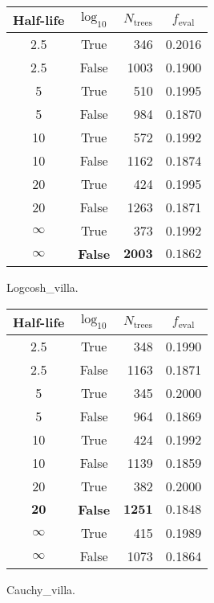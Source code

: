 \begin{margintable}
  \begin{tabular}{@{}ccrc@{}}
    Half-life & $\log_{10}$ & $N_\mathrm{trees}$ & $f_\mathrm{eval}$ \\
    \midrule
    \num{2.5} & True & \num{346} & \num{0.2016} \\
    \num{2.5} & False & \num{1003} & \num{0.1900} \\
    \num{5} & True & \num{510} & \num{0.1995} \\
    \num{5} & False & \num{984} & \num{0.1870} \\
    \num{10} & True & \num{572} & \num{0.1992} \\
    \num{10} & False & \num{1162} & \num{0.1874} \\
    \num{20} & True & \num{424} & \num{0.1995} \\
    \num{20} & False & \num{1263} & \num{0.1871} \\
    $\infty$ & True & \num{373} & \num{0.1992} \\
    $\bm{\infty}$ & \textbf{False} & $\mathbf{2003}$ & $\mathbf{0.1862}$ \\
  \end{tabular}
  \caption{\label{tab:h:HPO_initial_Logcosh_villa}Logcosh_villa.}
\end{margintable}

\begin{margintable}
  \begin{tabular}{@{}ccrc@{}}
    Half-life & $\log_{10}$ & $N_\mathrm{trees}$ & $f_\mathrm{eval}$ \\
    \midrule
    \num{2.5} & True & \num{348} & \num{0.1990} \\
    \num{2.5} & False & \num{1163} & \num{0.1871} \\
    \num{5} & True & \num{345} & \num{0.2000} \\
    \num{5} & False & \num{964} & \num{0.1869} \\
    \num{10} & True & \num{424} & \num{0.1992} \\
    \num{10} & False & \num{1139} & \num{0.1859} \\
    \num{20} & True & \num{382} & \num{0.2000} \\
    $\mathbf{20}$ & \textbf{False} & $\mathbf{1251}$ & $\mathbf{0.1848}$ \\
    $\infty$ & True & \num{415} & \num{0.1989} \\
    $\infty$ & False & \num{1073} & \num{0.1864} \\
  \end{tabular}
  \caption{\label{tab:h:HPO_initial_Cauchy_villa}Cauchy_villa.}
\end{margintable}

